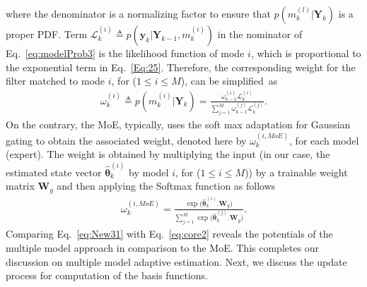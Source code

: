 \documentclass{ieeeaccess}
\def\aL{\mathcal{L}}
\def\k{_{k}}
\def\i{^{i}}
\def\bt{\bm{\theta}}
\def\Y{\bm{Y}}
\def\W{\bm{W}}
\def\pk{_{k-1}}
\def\y{\bm{y}}
\def\i{^{(i)}}
\begin{document}
%
where the denominator  is a normalizing factor to ensure that $p(m^{(l)}\k|\Y\k)$ is a proper  PDF. Term  $\aL\i\k \triangleq p(\y\k|\Y\pk, m^{(i)}\k)$ in  the nominator of Eq.~\eqref{eq:modelProb3} is the  likelihood function of mode $i$, which is proportional to the exponential term in Eq.~\eqref{Eq:25}. Therefore, the corresponding weight for the filter matched to mode $i$, for ($1 \leq i \leq M$), can be simplified~as
%
\begin{eqnarray}\label{eq:core2}
\omega\i\k  \triangleq p(m\k^{(i)}|\Y\k) = \frac{\omega\i\pk\aL\i\k}{\sum_{j=1}^{M}\omega^{(j)}\pk\aL^{(j)}\k}.
\end{eqnarray}
%
On the contrary, the MoE, typically, uses the soft max adaptation for Gaussian gating to obtain the associated weight, denoted here by $\omega^{(i, MoE)}\k$, for each model (expert). The weight is obtained by multiplying the input (in our case, the estimated state vector $\hat{\bt}\k\i$ by model $i$, for ($1 \leq i \leq M$)) by a trainable weight matrix $\W_g$ and then applying the Softmax function as follows
%
\begin{eqnarray}
\omega^{(i, MoE)}\k = \frac {\exp\big(\hat{\bt}\i\k . \W_g\big)}{\sum _{j=1}^{M}\exp\big(\hat{\bt}^{(j)}\k . \W_g\big)}.\label{eq:New31}
\end{eqnarray}
%
Comparing Eq.~\eqref{eq:New31} with Eq.~\eqref{eq:core2} reveals the potentials of the multiple model approach in comparison to the MoE. This completes our discussion on multiple model adaptive estimation. Next, we discuss the update process for computation of the basis functions.
\end{document}
